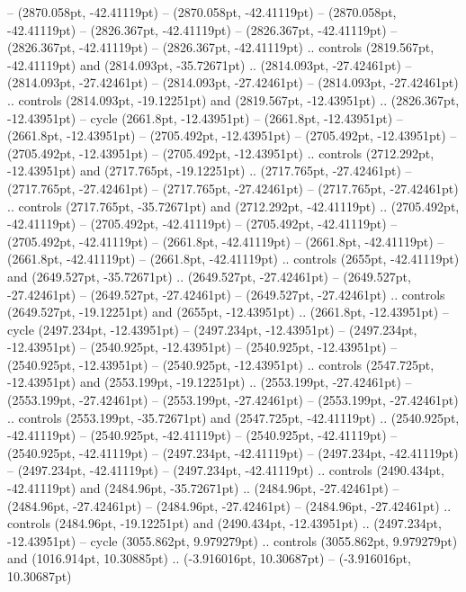  -- (2870.058pt, -42.41119pt)
 -- (2870.058pt, -42.41119pt)
 -- (2870.058pt, -42.41119pt)
 -- (2826.367pt, -42.41119pt)
 -- (2826.367pt, -42.41119pt)
 -- (2826.367pt, -42.41119pt)
 -- (2826.367pt, -42.41119pt) .. controls (2819.567pt, -42.41119pt) and (2814.093pt, -35.72671pt) .. (2814.093pt, -27.42461pt)
 -- (2814.093pt, -27.42461pt)
 -- (2814.093pt, -27.42461pt)
 -- (2814.093pt, -27.42461pt) .. controls (2814.093pt, -19.12251pt) and (2819.567pt, -12.43951pt) .. (2826.367pt, -12.43951pt) -- cycle
(2661.8pt, -12.43951pt) -- (2661.8pt, -12.43951pt)
 -- (2661.8pt, -12.43951pt)
 -- (2705.492pt, -12.43951pt)
 -- (2705.492pt, -12.43951pt)
 -- (2705.492pt, -12.43951pt)
 -- (2705.492pt, -12.43951pt) .. controls (2712.292pt, -12.43951pt) and (2717.765pt, -19.12251pt) .. (2717.765pt, -27.42461pt)
 -- (2717.765pt, -27.42461pt)
 -- (2717.765pt, -27.42461pt)
 -- (2717.765pt, -27.42461pt) .. controls (2717.765pt, -35.72671pt) and (2712.292pt, -42.41119pt) .. (2705.492pt, -42.41119pt)
 -- (2705.492pt, -42.41119pt)
 -- (2705.492pt, -42.41119pt)
 -- (2705.492pt, -42.41119pt)
 -- (2661.8pt, -42.41119pt)
 -- (2661.8pt, -42.41119pt)
 -- (2661.8pt, -42.41119pt)
 -- (2661.8pt, -42.41119pt) .. controls (2655pt, -42.41119pt) and (2649.527pt, -35.72671pt) .. (2649.527pt, -27.42461pt)
 -- (2649.527pt, -27.42461pt)
 -- (2649.527pt, -27.42461pt)
 -- (2649.527pt, -27.42461pt) .. controls (2649.527pt, -19.12251pt) and (2655pt, -12.43951pt) .. (2661.8pt, -12.43951pt) -- cycle
(2497.234pt, -12.43951pt) -- (2497.234pt, -12.43951pt)
 -- (2497.234pt, -12.43951pt)
 -- (2540.925pt, -12.43951pt)
 -- (2540.925pt, -12.43951pt)
 -- (2540.925pt, -12.43951pt)
 -- (2540.925pt, -12.43951pt) .. controls (2547.725pt, -12.43951pt) and (2553.199pt, -19.12251pt) .. (2553.199pt, -27.42461pt)
 -- (2553.199pt, -27.42461pt)
 -- (2553.199pt, -27.42461pt)
 -- (2553.199pt, -27.42461pt) .. controls (2553.199pt, -35.72671pt) and (2547.725pt, -42.41119pt) .. (2540.925pt, -42.41119pt)
 -- (2540.925pt, -42.41119pt)
 -- (2540.925pt, -42.41119pt)
 -- (2540.925pt, -42.41119pt)
 -- (2497.234pt, -42.41119pt)
 -- (2497.234pt, -42.41119pt)
 -- (2497.234pt, -42.41119pt)
 -- (2497.234pt, -42.41119pt) .. controls (2490.434pt, -42.41119pt) and (2484.96pt, -35.72671pt) .. (2484.96pt, -27.42461pt)
 -- (2484.96pt, -27.42461pt)
 -- (2484.96pt, -27.42461pt)
 -- (2484.96pt, -27.42461pt) .. controls (2484.96pt, -19.12251pt) and (2490.434pt, -12.43951pt) .. (2497.234pt, -12.43951pt) -- cycle
(3055.862pt, 9.979279pt) .. controls (3055.862pt, 9.979279pt) and (1016.914pt, 10.30885pt) .. (-3.916016pt, 10.30687pt)
 -- (-3.916016pt, 10.30687pt)
